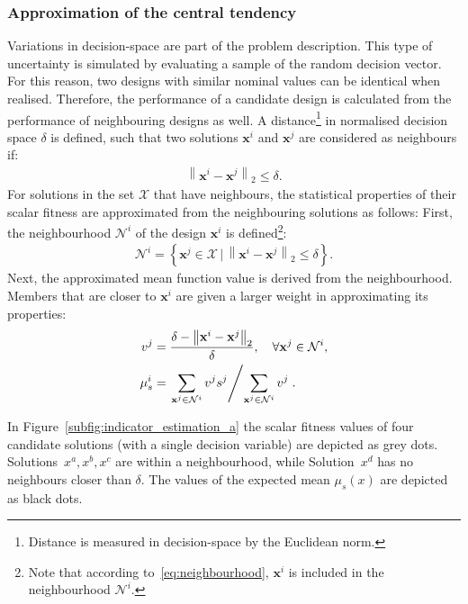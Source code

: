 \documentclass[10pt]{llncs}
\newcommand{\brr}[1]{{\left({#1}\right)}} %
\newcommand{\brf}[1]{\left\lbrace{#1}\right\rbrace} %
\newcommand{\norm}[2]{\left\|{#1}\right\|_{#2}} %
\newcommand{\vx}{\ensuremath{\mathbf{x}}} %
\newcommand{\NSet}{\ensuremath{\mathcal{N}}} %
\newcommand{\XSet}{\ensuremath{\mathcal{X}}} %
\begin{document}
\subsubsection{Approximation of the central tendency}
\label{subsubsec:appx central}
Variations in decision-space are part of the problem description. This type of uncertainty is simulated by evaluating a sample of the random decision vector. For this reason, two designs with similar nominal values can be identical when realised. Therefore, the performance of a candidate design is calculated from the performance of neighbouring designs as well. A distance\footnote{Distance is measured in decision-space by the Euclidean norm.} in normalised decision space $\delta$ is defined, such that two solutions $\vx^i$ and $\vx^j$ are considered as neighbours if:
\begin{align}
	\norm{\vx^i-\vx^j}{2}\leq\delta.
\end{align}
For solutions in the set $\XSet$ that have neighbours, the statistical properties of their scalar fitness are approximated from the neighbouring solutions as follows:
First, the neighbourhood $\NSet^i$ of the design $\vx^i$ is defined\footnote{Note that according to~\eqref{eq:neighbourhood}, $\vx^i$ is included in the neighbourhood $\NSet^i$.}:
\begin{align}
	\label{eq:neighbourhood}
	\NSet^i=\brf{\vx^j\in \XSet \,\vert \,\norm{\vx^i-\vx^j}{2}\leq\delta}.
\end{align}
Next, the approximated mean function value is derived from the neighbourhood. Members that are closer to $\vx^i$ are given a larger weight in approximating its properties:
\begin{align}
	v^j &= \frac{\delta-\norm{\vx^i-\vx^j}{2}}{\delta}, \quad  \forall \vx^j\in\NSet^i,\\
\label{eq:neighbourhood mean}	\mu^i_s &= \left. \sum_{\vx^j\in\NSet^i} v^j s^j \middle/ \sum_{\vx^j\in\NSet^i} v^j \right. .
\end{align}

In Figure~\ref{subfig:indicator_estimation_a} the scalar fitness values of four candidate solutions (with a single decision variable) are depicted as grey dots. Solutions~$x^a,x^b,x^c$ are within a neighbourhood, while Solution~$x^d$ has no neighbours closer than $\delta$. The values of the expected mean $\mu_s\brr{x}$ are depicted as black dots.
\end{document}
